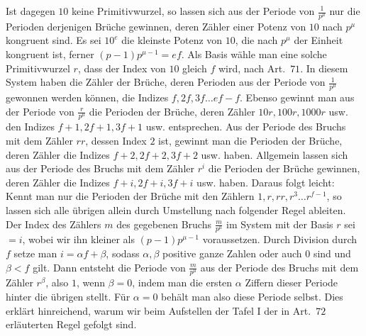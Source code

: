 \begin{samepage}
Ist dagegen \(10\) keine Primitivwurzel, so lassen sich aus der Periode von \(\frac1{p^\mu}\) nur die Perioden derjenigen Brüche gewinnen, deren Zähler einer Potenz von \(10\) nach \(p^\mu\) kongruent sind. Es sei \(10^e\) die kleinste Potenz von \(10\), die nach \(p^\mu\) der Einheit kongruent ist, ferner \((p-1)p^{\mu-1}=ef\). Als Basis wähle man eine solche Primitivwurzel \(r\), dass der Index von \(10\) gleich \(f\) wird, nach Art.\ \(71\). In diesem System haben die Zähler der Brüche, deren Perioden aus der Periode von \(\frac1{p^\mu}\) gewonnen werden können, die Indizes \(f,2f,3f\ldots ef-f\). Ebenso gewinnt man aus der Periode von \(\frac r{p^\mu}\) die Perioden der Brüche, deren Zähler \(10r,100r,1000r\) usw. den Indizes \(f+1,2f+1,3f+1\) usw. entsprechen. Aus der Periode des Bruchs mit dem Zähler \(rr\), dessen Index \(2\) ist, gewinnt man die Perioden der Brüche, deren Zähler
die Indizes \(f+2,2f+2,3f+2\) usw. haben. Allgemein lassen sich aus der Periode des Bruchs mit dem Zähler \(r^i\) die Perioden der Brüche gewinnen, deren Zähler die Indizes \(f+i,2f+i,3f+i\) usw. haben. Daraus folgt leicht: Kennt man nur die Perioden der Brüche mit den Zählern \(1,r,rr,r^3\ldots r^{f-1}\), so lassen sich alle übrigen allein durch Umstellung nach folgender Regel ableiten. Der Index des Zählers \(m\) des gegebenen Bruchs \(\frac m{p^\mu}\) im System mit der Basis \(r\) sei \(=i\), wobei wir ihn kleiner als \((p-1)p^{\mu-1}\) voraussetzen. Durch Division durch \(f\) setze man \(i=\alpha f+\beta\), sodass \(\alpha,\beta\) positive ganze Zahlen oder auch \(0\) sind und \(\beta<f\) gilt. Dann entsteht die Periode von \(\frac m{p^\mu}\) aus der Periode des Bruchs mit dem Zähler \(r^\beta\), also \(1\), wenn \(\beta=0\), indem man die ersten \(\alpha\) Ziffern dieser Periode hinter die übrigen stellt. Für \(\alpha=0\) behält man also diese Periode selbst. Dies erklärt hinreichend, warum wir beim Aufstellen der Tafel I der in Art.\ \(72\) erläuterten Regel gefolgt sind.
\par\end{samepage}

